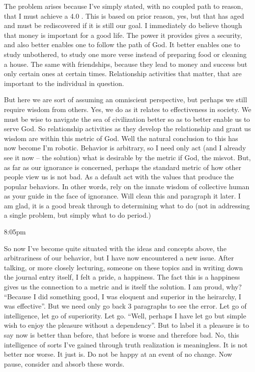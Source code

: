 The problem arises because I've simply stated, with no coupled path to
reason, that I must achieve a 4.0 . This is based on prior reason, yes,
but that has aged and must be rediscovered if it is still our goal. I
immediately do believe though that money is important for a good life.
The power it provides gives a security, and also better enables one to
follow the path of God. It better enables one to study unbothered, to
study one more verse instead of preparing food or cleaning a house. The
same with friendships, because they lead to money and success but only
certain ones at certain times. Relationship activities that matter, that
are important to the individual in question.

But here we are sort of assuming an omniscient perspective, but perhaps
we still require wisdom from others. Yes, we do as it relates to
effectiveness in society. We must be wise to navigate the sea of
civilization better so as to better enable us to serve God. So
relationship activities as they develop the relationship and grant us
wisdom are within this metric of God. Well the natural conclusion to
this has now become I'm robotic. Behavior is arbitrary, so I need only
act (and I already see it now -- the solution) what is desirable by the
metric if God, the misvot. But, as far as our ignorance is concerned,
perhaps the standard metric of how other people view us is not bad. As a
default act with the values that produce the popular behaviors. In other
words, rely on the innate wisdom of collective human as your guide in
the face of ignorance. Will clean this and paragraph it later. I am
glad, it is a good break through to determining what to do (not in
addressing a single problem, but simply what to do period.)

8:05pm

So now I've become quite situated with the ideas and concepts above, the
arbitrariness of our behavior, but I have now encountered a new issue.
After talking, or more closely lecturing, someone on these topics and in
writing down the journal entry itself, I felt a pride, a happiness. The
fact this is a happiness gives us the connection to a metric and is
itself the solution. I am proud, why? ``Because I did something good, I
was eloquent and superior in the heirarchy, I was effective''. But we
need only go back 3 paragraphs to see the error. Let go of intelligence,
let go of superiority. Let go. ``Well, perhaps I have let go but simple
wish to enjoy the pleasure without a dependency''. But to label it a
pleasure is to say now is better than before, that before is worse and
therefore bad. No, this intelligence of sorts I've gained through truth
realization is meaningless. It is not better nor worse. It just is. Do
not be happy at an event of no change. Now pause, consider and absorb
these words.

